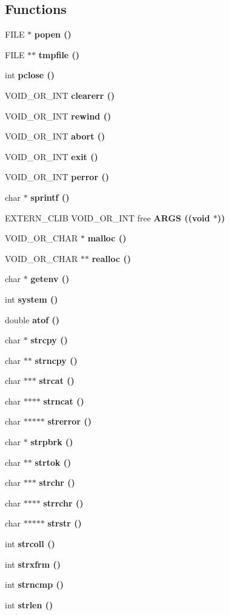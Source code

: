 \subsection*{Functions}
\begin{CompactItemize}
\item 
FILE $\ast$ \bf{popen} ()
\item 
FILE $\ast$$\ast$ \bf{tmpfile} ()
\item 
int \bf{pclose} ()
\item 
VOID\_\-OR\_\-INT \bf{clearerr} ()
\item 
VOID\_\-OR\_\-INT \bf{rewind} ()
\item 
VOID\_\-OR\_\-INT \bf{abort} ()
\item 
VOID\_\-OR\_\-INT \bf{exit} ()
\item 
VOID\_\-OR\_\-INT \bf{perror} ()
\item 
char $\ast$ \bf{sprintf} ()
\item 
EXTERN\_\-CLIB VOID\_\-OR\_\-INT free \bf{ARGS} ((void $\ast$))
\item 
VOID\_\-OR\_\-CHAR $\ast$ \bf{malloc} ()
\item 
VOID\_\-OR\_\-CHAR $\ast$$\ast$ \bf{realloc} ()
\item 
char $\ast$ \bf{getenv} ()
\item 
int \bf{system} ()
\item 
double \bf{atof} ()
\item 
char $\ast$ \bf{strcpy} ()
\item 
char $\ast$$\ast$ \bf{strncpy} ()
\item 
char $\ast$$\ast$$\ast$ \bf{strcat} ()
\item 
char $\ast$$\ast$$\ast$$\ast$ \bf{strncat} ()
\item 
char $\ast$$\ast$$\ast$$\ast$$\ast$ \bf{strerror} ()
\item 
char $\ast$ \bf{strpbrk} ()
\item 
char $\ast$$\ast$ \bf{strtok} ()
\item 
char $\ast$$\ast$$\ast$ \bf{strchr} ()
\item 
char $\ast$$\ast$$\ast$$\ast$ \bf{strrchr} ()
\item 
char $\ast$$\ast$$\ast$$\ast$$\ast$ \bf{strstr} ()
\item 
int \bf{strcoll} ()
\item 
int \bf{strxfrm} ()
\item 
int \bf{strncmp} ()
\item 
int \bf{strlen} ()
\item 

\end{CompactItemize}
